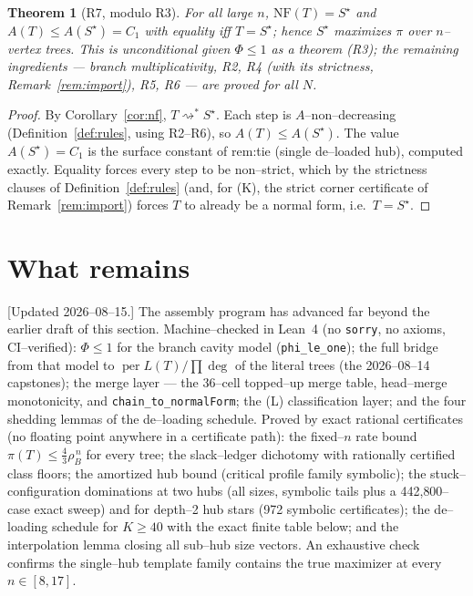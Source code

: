 \documentclass[11pt]{article}
\newtheorem{theorem}{Theorem}
\newcommand{\pit}{\pi}
\newcommand{\Norm}{\mathrm{NF}}
\begin{document}
\begin{theorem}[R7, modulo R3]\label{thm:R7}
For all large $n$, $\Norm(T)=S^\star$ and $A(T)\le A(S^\star)=C_1$ with equality iff $T=S^\star$; hence
$S^\star$ maximizes $\pit$ over $n$--vertex trees. This is unconditional given $\Phi\le1$ as a theorem (R3);
the remaining ingredients --- branch multiplicativity, R2, R4 (with its strictness, Remark~\ref{rem:import}),
R5, R6 --- are proved for all $N$.
\end{theorem}

\begin{proof}
By Corollary~\ref{cor:nf}, $T\rightsquigarrow^\ast S^\star$. Each step is $A$--non--decreasing
(Definition~\ref{def:rules}, using R2--R6), so $A(T)\le A(S^\star)$. The value $A(S^\star)=C_1$ is the surface
constant of rem:tie (single de--loaded hub), computed exactly. Equality forces every step to be non--strict,
which by the strictness clauses of Definition~\ref{def:rules} (and, for (K), the strict corner certificate of
Remark~\ref{rem:import}) forces $T$ to already be a normal form, i.e.\ $T=S^\star$.
\end{proof}

\section{What remains}\label{sec:remains}

[Updated 2026--08--15.] The assembly program has advanced far beyond the earlier draft of this
section. Machine--checked in Lean~4 (no \texttt{sorry}, no axioms, CI--verified): $\Phi\le1$ for the
branch cavity model (\texttt{phi\_le\_one}); the full bridge from that model to
$\operatorname{per}L(T)/\prod\deg$ of the literal trees (the 2026--08--14 capstones); the merge layer
--- the 36--cell topped--up merge table, head--merge monotonicity, and
\texttt{chain\_to\_normalForm}; the (L) classification layer; and the four shedding lemmas of the
de--loading schedule. Proved by exact rational certificates (no floating point anywhere in a
certificate path): the fixed--$n$ rate bound $\pi(T)\le\tfrac43\rho_B^{\,n}$ for every tree; the
slack--ledger dichotomy with rationally certified class floors; the amortized hub bound (critical
profile family symbolic); the stuck--configuration dominations at two hubs (all sizes, symbolic
tails plus a 442{,}800--case exact sweep) and for depth--2 hub stars (972 symbolic certificates);
the de--loading schedule for $K\ge40$ with the exact finite table below; and the interpolation lemma
closing all sub--hub size vectors. An exhaustive check confirms the single--hub template family
contains the true maximizer at every $n\in[8,17]$.
\end{document}
